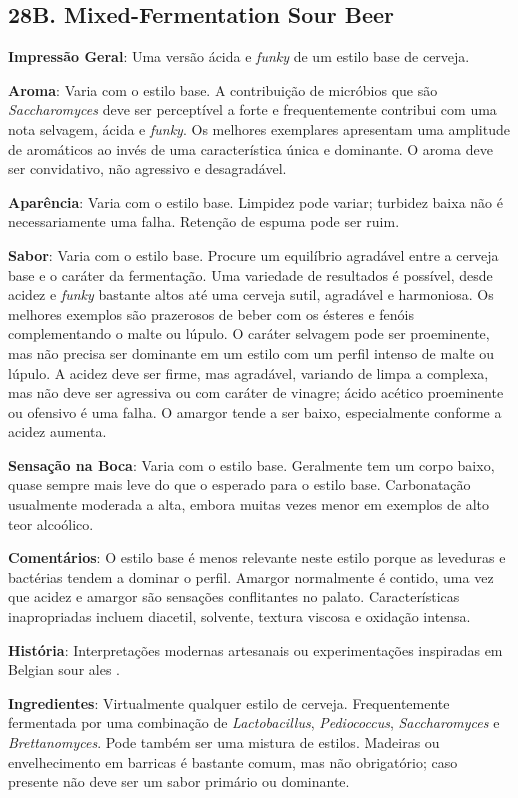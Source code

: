 \subsection*{28B. Mixed-Fermentation Sour Beer}
\textbf{Impressão Geral}: Uma versão ácida e \textit{funky} de um estilo base de cerveja.

\textbf{Aroma}: Varia com o estilo base. A contribuição de micróbios que são \textit{Saccharomyces} deve ser perceptível a forte e frequentemente contribui com uma nota selvagem, ácida e \textit{funky}. Os melhores exemplares apresentam uma amplitude de aromáticos ao invés de uma característica única e dominante. O aroma deve ser convidativo, não agressivo e desagradável.

\textbf{Aparência}: Varia com o estilo base. Limpidez pode variar; turbidez baixa não é necessariamente uma falha. Retenção de espuma pode ser ruim.

\textbf{Sabor}: Varia com o estilo base. Procure um equilíbrio agradável entre a cerveja base e o caráter da fermentação. Uma variedade de resultados é possível, desde acidez e \textit{funky} bastante altos até uma cerveja sutil, agradável e harmoniosa. Os melhores exemplos são prazerosos de beber com os ésteres e fenóis complementando o malte ou lúpulo. O caráter selvagem pode ser proeminente, mas não precisa ser dominante em um estilo com um perfil intenso de malte ou lúpulo. A acidez deve ser firme, mas agradável, variando de limpa a complexa, mas não deve ser agressiva ou com caráter de vinagre; ácido acético proeminente ou ofensivo é uma falha. O amargor tende a ser baixo, especialmente conforme a acidez aumenta.

\textbf{Sensação na Boca}: Varia com o estilo base. Geralmente tem um corpo baixo, quase sempre mais leve do que o esperado para o estilo base. Carbonatação usualmente moderada a alta, embora muitas vezes menor em exemplos de alto teor alcoólico.

\textbf{Comentários}: O estilo base é menos relevante neste estilo porque as leveduras e bactérias tendem a dominar o perfil. Amargor normalmente é contido, uma vez que acidez e amargor são sensações conflitantes no palato. Características inapropriadas incluem diacetil, solvente, textura viscosa e oxidação intensa.

\textbf{História}: Interpretações modernas artesanais ou experimentações inspiradas em Belgian sour ales .

\textbf{Ingredientes}: Virtualmente qualquer estilo de cerveja. Frequentemente fermentada por uma combinação de \textit{Lactobacillus}, \textit{Pediococcus}, \textit{Saccharomyces} e \textit{Brettanomyces}. Pode também ser uma mistura de estilos. Madeiras ou envelhecimento em barricas é bastante comum, mas não obrigatório; caso presente não deve ser um sabor primário ou dominante.

